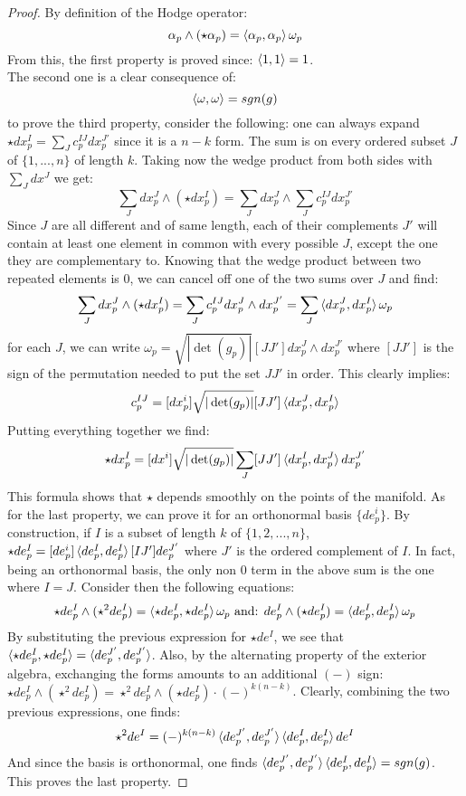 \documentclass[12pt,a4paper]{report}
\theoremstyle{definition}
\theoremstyle{Theorem}
\theoremstyle{definition}
\theoremstyle{definition}
\begin{document}
	\begin{proof}
		By definition of the Hodge operator:
		$$\alpha_p\wedge(\star\alpha_p)=\braket{\alpha_p,\alpha_p}\omega_p$$
		From this, the first property is proved since: $\braket{1,1}=1$.\\
		The second one is a clear consequence of:
		$$\braket{\omega,\omega}=sgn(g)$$
		to prove the third property, consider the following: one can always expand $\star dx^I_p=\sum_Jc_p^{IJ}dx_p^{J'}$ since it is a $n-k$ form. The sum is on every ordered subset $J$ of $\{1,...,n\}$ of length $k$. Taking now the wedge product from both sides with $\sum_J dx^J$ we get:
		$$\sum_Jdx_p^J\wedge(\star dx_p^I)=\sum_Jdx_p^J\wedge\sum_Jc_p^{IJ}dx_p^{J'}$$
		Since $J$ are all different and of same length, each of their complements $J'$ will contain at least one element in common with every possible $J$, except the one they are complementary to. Knowing that the wedge product between two repeated elements is 0, we can cancel off one of the two sums over $J$ and find:
		$$\sum_Jdx_p^J\wedge(\star dx_p^I)=\sum_Jc_p^{IJ}dx_p^J\wedge dx_p^{J'}=\sum_J\braket{dx_p^J,dx_p^I}\omega_p$$
		for each $J$, we can write $\omega_p=\sqrt{|\det(g_p)|}[JJ']dx_p^J\wedge dx_p^{J'}$ where $[JJ']$ is the sign of the permutation needed to put the set $JJ'$ in order. This clearly implies:
		$$c_p^{IJ}=[dx_p^i]\sqrt{|\det(g_p)|}[JJ']\braket{dx_p^J,dx_p^I}$$
		Putting everything together we find:
		$$\star dx_p^I=[dx^i]\sqrt{|\det(g_p)|}\sum_J[JJ']\braket{dx_p^I,dx_p^J}dx_p^{J'}$$
		This formula shows that $\star$ depends smoothly on the points of the manifold.
		As for the last property, we can prove it for an orthonormal basis $\{de_p^i\}$. By construction, if $I$ is a subset of length $k$ of $\{1,2,...,n\}$, $\star de_p^I=[de_p^i]\braket{de_p^I,de_p^I}[IJ'] de_p^{J'}$ where $J'$ is the ordered complement of $I$. In fact, being an orthonormal basis, the only non 0 term in the above sum is the one where $I=J$. Consider then the following equations:
		$$\star de_p^I\wedge (\star^2 de_p^I)=\braket{\star de_p^I,\star de_p^I}\omega_p\hbox{ and: } de_p^I\wedge (\star de_p^I)=\braket{de_p^I,de_p^I}\omega_p$$
		By substituting the previous expression for $\star de^I$, we see that $\braket{\star de_p^I,\star de_p^I}=\braket{de_p^{J'}, de_p^{J'}}$. Also, by the alternating property of the exterior algebra, exchanging the forms amounts to an additional $(-)$ sign: $\star de_p^I\wedge (\star^2 de_p^I)=\star^2 de_p^I\wedge (\star de_p^I)\cdot (-)^{k(n-k)}$. Clearly, combining the two previous expressions, one finds:
		$$\star^2 de^I=(-)^{k(n-k)}\braket{de_p^{J'}, de_p^{J'}}\braket{de_p^{I}, de_p^{I}}de^I$$
		And since the basis is orthonormal, one finds $\braket{de_p^{J'}, de_p^{J'}}\braket{de_p^{I}, de_p^{I}}=sgn(g)$. This proves the last property.
	\end{proof}
\end{document}
